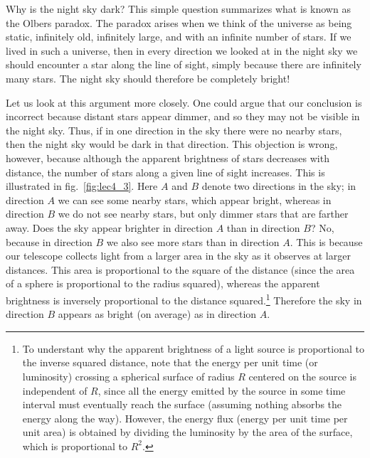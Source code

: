 Why is the night sky dark? This simple question summarizes what is known as the Olbers paradox. The paradox arises when we think of the universe as being static, infinitely old, infinitely large, and with an infinite number of stars. If we lived in such a universe, then in every direction we looked at in the night sky we should encounter a star along the line of sight, simply because there are infinitely many stars. The night sky should therefore be completely bright!

Let us look at this argument more closely. One could argue that our conclusion is incorrect because distant stars appear dimmer, and so they may not be visible in the night sky. Thus, if in one direction in the sky there were no nearby stars, then the night sky would be dark in that direction. This objection is wrong, however, because although the apparent brightness of stars decreases with distance, the number of stars along a given line of sight increases. This is illustrated in fig.\ \ref{fig:lec4_3}. Here $A$ and $B$ denote two directions in the sky; in direction $A$ we can see some nearby stars, which appear bright, whereas in direction $B$ we do not see nearby stars, but only dimmer stars that are farther away. Does the sky appear brighter in direction $A$ than in direction $B$? No, because in direction $B$ we also see more stars than in direction $A$. This is because our telescope collects light from a larger area in the sky as it observes at larger distances. This area is proportional to the square 
of the distance (since the area of a sphere is proportional to the radius squared), whereas the apparent brightness is inversely proportional to the distance squared.\footnote{To understant why the apparent brightness of a light source is proportional to the inverse squared distance, note that the energy per unit time (or luminosity) crossing a spherical surface of radius $R$ centered on the source is independent of $R$, since all the energy emitted by the source in some time interval must eventually reach the surface (assuming nothing absorbs the energy along the way). However, the energy flux (energy per unit time per unit area) is obtained by dividing the luminosity by the area of the surface, which is proportional to $R^2$.} Therefore the sky in direction $B$ appears as bright (on average) as in direction $A$.
